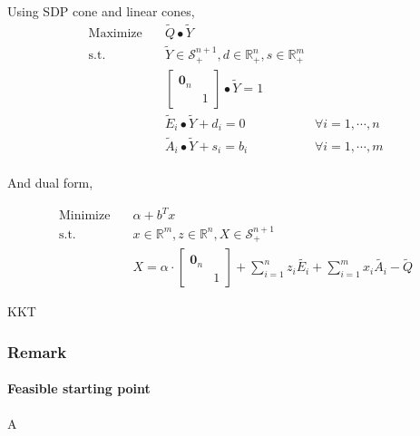 \documentclass[../main]{subfiles}
\begin{document}
Using SDP cone and linear cones,
\begin{equation} \label{eq:ws.std.primal}
    \begin{aligned}
        \mathrm{Maximize}\quad & \tilde Q \bullet \tilde Y                                                         \\
        \mathrm{s.t.} \quad    & \tilde Y  \in \mathscr S^{n+1}_+, d \in \mathbb{R}^n_+, s
        \in \mathbb{R}^m_+                                                                                         \\
                               & \begin{bmatrix}  \bm 0_n &  \\  & 1  \end{bmatrix} \bullet \tilde Y = 1                                   \\
                               & \tilde E_i \bullet \tilde Y + d_i = 0                     & \forall i=1,\cdots, n \\
                               & \tilde A_i \bullet \tilde Y + s_i = b_i                   & \forall i=1,\cdots, m \\
    \end{aligned}
\end{equation}

And dual form,

\begin{equation} \label{eq:ws.std.dual}
    \begin{aligned}
        \mathrm{Minimize} \quad & \alpha + b^Tx                                                    \\
        \mathrm{s.t.} \quad     & x \in \mathbb{R}^m, z\in \mathbb{R}^n, X  \in \mathscr S^{n+1}_+ \\
                                & X =\alpha \cdot \begin{bmatrix}  \bm 0_n &  \\  & 1  \end{bmatrix}
        + \sum_{i=1}^{n} z_{i} \tilde{E_i}
        + \sum_{i=1}^{m} x_{i} \tilde{A_i}
        - \tilde{Q}
    \end{aligned}
\end{equation}

KKT 

\subsubsection{Remark}
\paragraph{Feasible starting point} A
\end{document}
